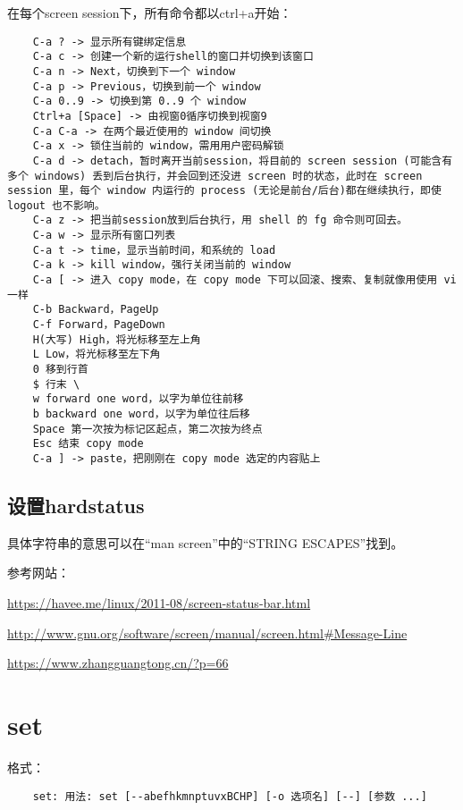 \documentclass[a4paper,left=2.5cm,right=2.5cm,11pt]{article}
\begin{document}
	在每个screen session下，所有命令都以ctrl+a开始：
	\begin{lstlisting}
	C-a ? -> 显示所有键绑定信息 
	C-a c -> 创建一个新的运行shell的窗口并切换到该窗口 
	C-a n -> Next，切换到下一个 window 
	C-a p -> Previous，切换到前一个 window 
	C-a 0..9 -> 切换到第 0..9 个 window 
	Ctrl+a [Space] -> 由视窗0循序切换到视窗9 
	C-a C-a -> 在两个最近使用的 window 间切换 
	C-a x -> 锁住当前的 window，需用用户密码解锁 
	C-a d -> detach，暂时离开当前session，将目前的 screen session (可能含有多个 windows) 丢到后台执行，并会回到还没进 screen 时的状态，此时在 screen session 里，每个 window 内运行的 process (无论是前台/后台)都在继续执行，即使 logout 也不影响。 
	C-a z -> 把当前session放到后台执行，用 shell 的 fg 命令则可回去。 
	C-a w -> 显示所有窗口列表 
	C-a t -> time，显示当前时间，和系统的 load 
	C-a k -> kill window，强行关闭当前的 window 
	C-a [ -> 进入 copy mode，在 copy mode 下可以回滚、搜索、复制就像用使用 vi 一样 
	C-b Backward，PageUp 
	C-f Forward，PageDown 
	H(大写) High，将光标移至左上角 
	L Low，将光标移至左下角 
	0 移到行首 
	$ 行末 \
	w forward one word，以字为单位往前移 
	b backward one word，以字为单位往后移 
	Space 第一次按为标记区起点，第二次按为终点 
	Esc 结束 copy mode 
	C-a ] -> paste，把刚刚在 copy mode 选定的内容贴上
	\end{lstlisting}

\subsection{设置hardstatus}
	具体字符串的意思可以在“man screen”中的“STRING ESCAPES”找到。\par

	参考网站：\par
	\url{https://havee.me/linux/2011-08/screen-status-bar.html}\par
	\url{http://www.gnu.org/software/screen/manual/screen.html#Message-Line}\par
	\url{https://www.zhangguangtong.cn/?p=66}

\section{set}
	格式：
	\begin{lstlisting}
	set: 用法: set [--abefhkmnptuvxBCHP] [-o 选项名] [--] [参数 ...]
	\end{lstlisting}
\end{document}
